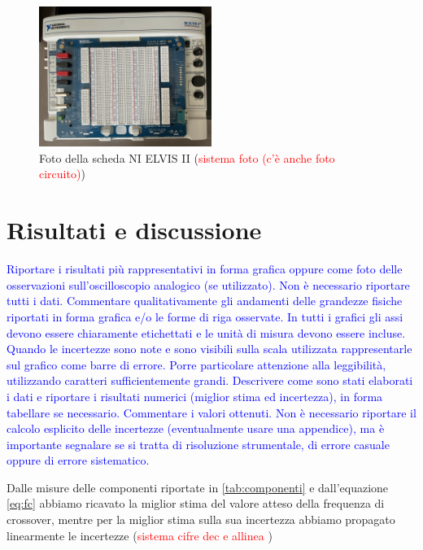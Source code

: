\documentclass[12pt,italian]{article}
\newcommand{\prof}[1]{\textcolor{blue}{#1}}
\newcommand{\err}[1]{\textcolor{red}{#1}}
\begin{document}
\begin{figure}[h]
  \centering
  \includegraphics[width=0.5\textwidth]{Images/Elvis.jpg}
  \caption{Foto della scheda NI ELVIS II (\err{sistema foto (c'è anche foto circuito)})}
  \label{fig:Elvis}
\end{figure}

\section*{Risultati e discussione}
\prof{ Riportare i risultati più rappresentativi in forma grafica oppure come
  foto delle osservazioni sull'oscilloscopio analogico (se utilizzato). Non è
  necessario riportare tutti i dati. Commentare qualitativamente gli andamenti
  delle grandezze fisiche riportati in forma grafica e/o le forme di riga
  osservate. In tutti i grafici gli assi devono essere chiaramente etichettati e
  le unità di misura devono essere incluse. Quando le incertezze sono note e
  sono visibili sulla scala utilizzata rappresentarle sul grafico come barre di
  errore. Porre particolare attenzione alla leggibilità, utilizzando caratteri
  sufficientemente grandi. Descrivere come sono stati elaborati i dati e
  riportare i risultati numerici (miglior stima ed incertezza), in forma
  tabellare se necessario. Commentare i valori ottenuti. Non è necessario
  riportare il calcolo esplicito delle incertezze (eventualmente usare una
  appendice), ma è importante segnalare se si tratta di risoluzione strumentale,
  di errore casuale oppure di errore sistematico. }

Dalle misure delle componenti riportate in \cref{tab:componenti} e
dall'equazione \eqref{eq:fc} abbiamo ricavato la miglior stima del valore
atteso della frequenza di crossover, mentre per la miglior stima sulla sua
incertezza abbiamo propagato linearmente le incertezze (\err{sistema cifre dec
  e allinea })
\end{document}
